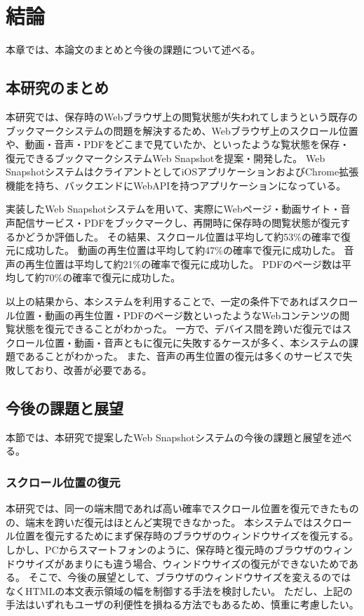 \chapter{結論}
\label{chap:conclusion}
本章では、本論文のまとめと今後の課題について述べる。

\section{本研究のまとめ}
\label{section:conclusion}
本研究では、保存時のWebブラウザ上の閲覧状態が失われてしまうという既存のブックマークシステムの問題を解決するため、Webブラウザ上のスクロール位置や、動画・音声・PDFをどこまで見ていたか、といったような覧状態を保存・復元できるブックマークシステムWeb Snapshotを提案・開発した。
Web SnapshotシステムはクライアントとしてiOSアプリケーションおよびChrome拡張機能を持ち、バックエンドにWebAPIを持つアプリケーションになっている。

実装したWeb Snapshotシステムを用いて、実際にWebページ・動画サイト・音声配信サービス・PDFをブックマークし、再開時に保存時の閲覧状態が復元するかどうか評価した。
その結果、スクロール位置は平均して約53\%の確率で復元に成功した。
動画の再生位置は平均して約47\%の確率で復元に成功した。
音声の再生位置は平均して約21\%の確率で復元に成功した。
PDFのページ数は平均して約70\%の確率で復元に成功した。

以上の結果から、本システムを利用することで、一定の条件下であればスクロール位置・動画の再生位置・PDFのページ数といったようなWebコンテンツの閲覧状態を復元できることがわかった。
一方で、デバイス間を跨いだ復元ではスクロール位置・動画・音声ともに復元に失敗するケースが多く、本システムの課題であることがわかった。
また、音声の再生位置の復元は多くのサービスで失敗しており、改善が必要である。

\section{今後の課題と展望}
本節では、本研究で提案したWeb Snapshotシステムの今後の課題と展望を述べる。

\subsection{スクロール位置の復元}
本研究では、同一の端末間であれば高い確率でスクロール位置を復元できたものの、端末を跨いだ復元はほとんど実現できなかった。
本システムではスクロール位置を復元するためにまず保存時のブラウザのウィンドウサイズを復元する。
しかし、PCからスマートフォンのように、保存時と復元時のブラウザのウィンドウサイズがあまりにも違う場合、ウィンドウサイズの復元ができないためである。
そこで、今後の展望として、ブラウザのウィンドウサイズを変えるのではなくHTMLの本文表示領域の幅を制御する手法を検討したい。
ただし、上記の手法はいずれもユーザの利便性を損ねる方法でもあるため、慎重に考慮したい。

